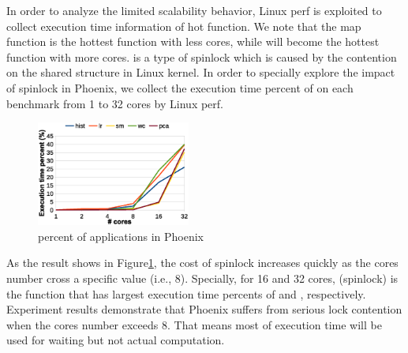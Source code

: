 In order to analyze the limited scalability behavior, Linux perf is exploited to collect execution time information of hot function. 
We note that the map function is the hottest function with less cores, while \lock will become the hottest function with more cores.
\lock is a type of spinlock which is caused by the contention on the shared structure in Linux kernel.
In order to specially explore the impact of spinlock in Phoenix, we collect the execution time percent of \lock on each benchmark from 1 to 32 cores by Linux perf.

\begin{figure}[!h!t]  
	\centering
	\includegraphics[width=0.45\textwidth]{eps/phoenix_spinlock_jemalloc.eps}
	\caption{\lock percent of applications in Phoenix}
	\label{fig:phoenix:spinlock:jemalloc}
\end{figure}

As the result shows in Figure\ref{fig:phoenix:spinlock:jemalloc}, the cost of spinlock increases quickly as the cores number cross a specific value (i.e., 8).
Specially, for  16 and 32 cores, \lock (\ie spinlock) is the function that has largest execution time percents of  and , respectively. 
Experiment results demonstrate that Phoenix suffers from serious lock contention when the cores number exceeds 8. 
That means most of execution time will be used for waiting but not actual computation.





